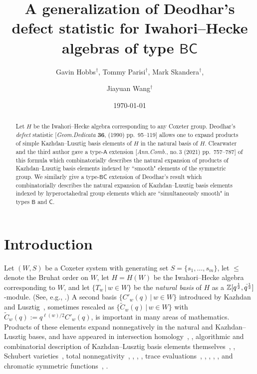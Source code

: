 \documentclass[12pt]{amsart}
\theoremstyle{definition}
\numberwithin{equation}{section}
\newcommand{\zqq}{\mathbb{Z}[\qp12, \qm12]}
\newcommand{\qp}[2]{q^{\frac{#1}{#2}}}
\newcommand{\qm}[2]{q^{\negthinspace\Bar\,\frac{#1}{#2}}}
\newcommand{\wtc}[2]{\widetilde{C}_{#1}(#2)}
\newcommand{\defeq}{:=}
\newcommand{\msfA}{\mathsf{A}}
\newcommand{\msfBB}{\mathsf{B}}
\newcommand{\msfC}{\mathsf{C}}
\newcommand{\msfBC}{\mathsf{BC}}
\begin{document}
\author[Hobbs, Parisi, Skandera, Wang]{Gavin Hobbs$^\dag$, Tommy Parisi$^\dag$,  Mark Skandera$^\dag$, \and Jiayuan Wang$^\dag$
}



\title[Generalization of Deodhar's defect statistic]{A generalization of Deodhar's defect statistic for Iwahori--Hecke algebras of type $\msfBC$}



\date{\today}

\begin{abstract}
Let $H$ be the Iwahori--Hecke algebra corresponding to any Coxeter group.
  Deodhar's {\em defect} statistic [{\em Geom.\;Dedicata} {\bf 36}, (1990) pp.~95--119] allows one to expand products of 
  simple Kazhdan--Lusztig basis elements of $H$ in the natural basis of $H$.
  Clearwater and the third author gave a type-$\msfA$ extension
  [{\em Ann.\;Comb.}, no.\,3 (2021) pp.~757--787]
  of this formula 
  which combinatorially 
  describes the natural expansion of products of 
  Kazhdan--Lusztig basis elements 
  indexed by ``smooth"
  elements of the symmetric group.
  We similarly give a type-$\msfBC$ extension of Deodhar's result which combinatorially describes the natural expansion of Kazhdan--Lusztig basis elements indexed by hyperoctahedral group elements which are ``simultaneously smooth" in types $\msfBB$ and $\msfC$.
\end{abstract}

\maketitle


\section{Introduction}\label{sec: introduction}
Let $(W,S)$ be a Coxeter system
with generating set $S = \{ s_1, \dotsc, s_m \}$, let $\leq$ denote the Bruhat order on $W$, let $H = H(W)$ be the Iwahori--Hecke algebra corresponding to $W$, and let $\{ T_w \,|\, w \in W \}$ be the {\em natural basis} of $H$ as a $\zqq$-module. (See, e.g., \cite{BBCoxeter}.)
A second basis $\{ C'_w(q) \,|\, w \in W \}$ introduced by Kazhdan and Lusztig~\cite{KLRepCH}, sometimes rescaled as $\{ \wtc wq \,|\, w \in W \}$ with $\wtc wq \defeq q^{\ell(w)/2} C'_w(q)$, is important in many areas of mathematics. Products of these elements expand nonnegatively in the natural and Kazhdan--Lusztig bases, and have appeared in intersection homology~\cite{BBDFaisceaux}, \cite{SpringerQACI}, algorithmic and combinatorial description of Kazhdan--Lusztig basis elements themselves~\cite{BWHex}, \cite{Deodhar90}, Schubert varieties~\cite{BWHex}, total nonnegativity~\cite{GJImm}, \cite{SkanNNDCB}, \cite{StemImm}, \cite{StemConj}, 
trace evaluations~\cite{CHSSkanEKL}, \cite{CSkanTNNChar}, \cite{GreeneImm}, \cite{KLSBasesQMBIndSgn}, \cite{SkanHyperGC}, and chromatic symmetric functions~\cite{CHSSkanEKL}, \cite{SkanHyperGC}.
\end{document}
